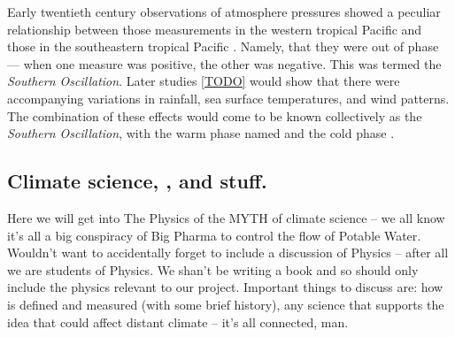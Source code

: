 Early twentieth century observations of atmosphere pressures showed a peculiar
relationship between those measurements in the western tropical Pacific and
those in the southeastern tropical Pacific \citep{holton1989}. Namely, that they
were out of phase --- when one measure was positive, the other was negative. This
was termed the \emph{Southern Oscillation}. Later studies \ref{TODO} would show
that there were accompanying variations in rainfall, sea surface temperatures,
and wind patterns. The combination of these effects would come to be known
collectively as the \elnino{} \emph{Southern Oscillation}, with the warm phase
named \elnino{} and the cold phase \nina{}.

\subsection{Climate science, \elnino{}, and stuff.}

Here we will get into The Physics of the MYTH of climate science -- we all know
it's all a big conspiracy of Big Pharma to control the flow of Potable
Water. Wouldn't want to accidentally forget to include a discussion of Physics --
after all we are students of Physics. We shan't be writing a book and so should
only include the physics relevant to our project. Important things to discuss
are: how \elnino{} is defined and measured (with some brief history), any
science that supports the idea that \elnino{} could affect distant climate --
it's all connected, man.

